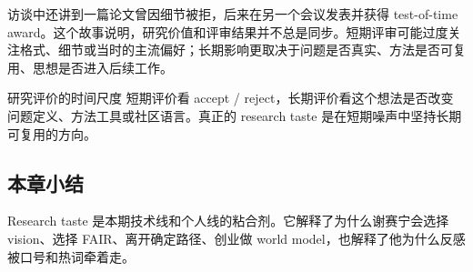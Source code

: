 访谈中还讲到一篇论文曾因细节被拒，后来在另一个会议发表并获得 test-of-time award。这个故事说明，研究价值和评审结果并不总是同步。短期评审可能过度关注格式、细节或当时的主流偏好；长期影响更取决于问题是否真实、方法是否可复用、思想是否进入后续工作。

\begin{importantbox}{研究评价的时间尺度}
短期评价看 accept / reject，长期评价看这个想法是否改变问题定义、方法工具或社区语言。真正的 research taste 是在短期噪声中坚持长期可复用的方向。
\end{importantbox}

\subsection{本章小结}

Research taste 是本期技术线和个人线的粘合剂。它解释了为什么谢赛宁会选择 vision、选择 FAIR、离开确定路径、创业做 world model，也解释了他为什么反感被口号和热词牵着走。

